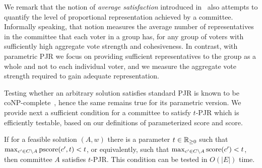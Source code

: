 We remark that the notion of \emph{average satisfaction} introduced in~\cite{sanchez2017proportional} also attempts to quantify the level of proportional representation achieved by a committee. 
Informally speaking, that notion measures the average number of representatives in the committee that each voter in a group has, for any group of voters with sufficiently high aggregate vote strength and cohesiveness. 
In contrast, with parametric PJR we focus on providing sufficient representatives to the group as a whole and not to each individual voter, and we measure the aggregate vote strength required to gain adequate representation.

Testing whether an arbitrary solution satisfies standard PJR is known to be coNP-complete~\cite{aziz2018complexity}, hence the same remains true for its parametric version.
We provide next a sufficient condition for a committee to satisfy $t$-PJR which is efficiently testable, based on our definitions of parameterized score and score.  

\begin{lemma} \label{lem:locality}
If for a feasible solution $(A,w)$ there is a parameter $t\in\mathbb{R}_{\geq 0}$ such that $\max_{c'\in C\setminus A} \operatorname{pscore}(c',t)<t$, or equivalently, such that $\max_{c'\in C\setminus A} \operatorname{score}(c') <t$, then committee $A$ satisfies $t$-PJR. 
This condition can be tested in $O(|E|)$ time.
\end{lemma}

